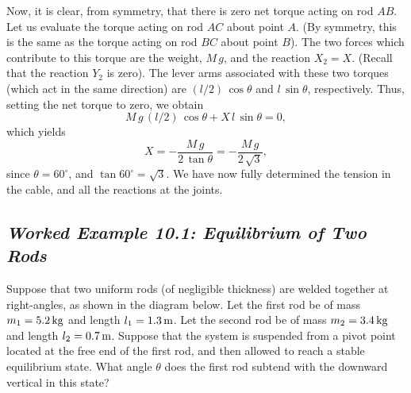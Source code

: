 Now, it is clear, from symmetry, that there is zero net torque acting on rod $AB$. Let us evaluate
the torque acting on rod $AC$ about point $A$. (By symmetry, this
is the same as the torque acting on rod $BC$ about point $B$). The two forces which contribute to
this torque are the weight, $M\,g$, and the reaction $X_2=X$. (Recall that the reaction $Y_2$
is zero). The lever arms associated with these two torques (which act in the same direction)
are $(l/2)\,\cos\theta$ and $l\,\sin\theta$, respectively. Thus, setting the net torque
to zero, we obtain
\begin{equation}
M\,g\,(l/2)\,\cos\theta + X\,l\,\sin\theta = 0,
\end{equation}
which yields
\begin{equation}
X = -\frac{M\,g}{2\,\tan\theta} = -\frac{M\,g}{2\,\sqrt{3}},
\end{equation}
since $\theta = 60^\circ$, and $\tan 60^\circ = \sqrt{3}$. We have now fully determined the
tension in the cable, and all the  reactions
at the joints.

\subsection*{\em Worked Example 10.1: Equilibrium  of Two Rods}
 Suppose that two uniform rods (of negligible thickness)
 are welded together at right-angles, as shown in the
diagram below. Let the first rod be of mass $m_1=5.2\,{\rm kg}$ and length $l_1=1.3\,{\rm m}$.
Let the second rod be of mass $m_2=3.4\,{\rm kg}$ and length $l_2=0.7\,{\rm m}$. Suppose that
the system is suspended from a pivot point located at the free end of the first rod, and then allowed to
reach a stable equilibrium state. What angle $\theta$ does the first rod subtend with the
downward vertical in this state?
\begin{figure*}[h]
\epsfysize=2.5in
\centerline{}
\end{figure*}

